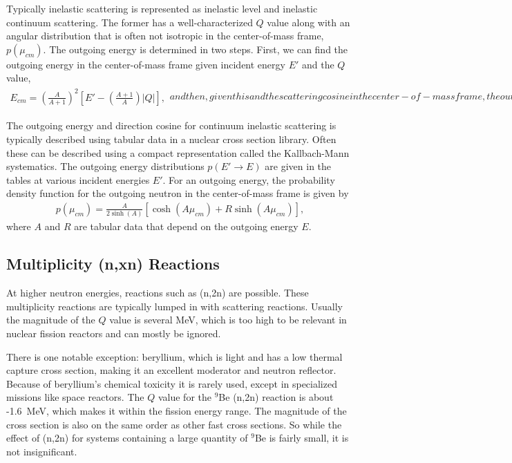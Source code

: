Typically inelastic scattering is represented as inelastic level and inelastic continuum scattering. The former has a well-characterized $Q$ value along with an angular distribution that is often not isotropic in the center-of-mass frame, $p(\mu_{cm})$. The outgoing energy is determined in two steps. First, we can find the outgoing energy in the center-of-mass frame given incident energy $E'$ and the $Q$ value,
\begin{subequations}
\begin{align}
  E_{cm} = \left( \frac{A}{A+1} \right)^2 \left[ E' -  \left( \frac{A+1}{A} \right) |Q| \right] ,
\end{align}
and then, given this and the scattering cosine in the center-of-mass frame, the outgoing energy in the lab frame is
\begin{align}
  E = E_{cm} + \frac{ E' + 2 \mu_{cm} ( A + 1 ) \sqrt{ E' E_{cm} } }{ ( A + 1 )^2 } .
\end{align}
\end{subequations}

The outgoing energy and direction cosine for continuum inelastic scattering is typically described using tabular data in a nuclear cross section library. Often these can be described using a compact representation called the Kallbach-Mann systematics. The outgoing energy distributions $p(E' \rightarrow E)$ are given in the tables at various incident energies $E'$. For an outgoing energy, the probability density function for the outgoing neutron in the center-of-mass frame is given by
\begin{align}
  p(\mu_{cm}) = \frac{A}{2 \sinh(A) } \left[ \cosh(A\mu_{cm}) + R \sinh(A\mu_{cm}) \right],
\end{align}
where $A$ and $R$ are tabular data that depend on the outgoing energy $E$.

\subsection{Multiplicity (n,xn) Reactions}

At higher neutron energies, reactions such as (n,2n) are possible. These multiplicity reactions are typically lumped in with scattering reactions. Usually the magnitude of the $Q$ value is several MeV, which is too high to be relevant in nuclear fission reactors and can mostly be ignored. 

There is one notable exception: beryllium, which is light and has a low thermal capture cross section, making it an excellent moderator and neutron reflector. Because of beryllium's chemical toxicity it is rarely used, except in specialized missions like space reactors. The $Q$ value for the $^9$Be (n,2n) reaction is about -1.6~MeV, which makes it within the fission energy range. The magnitude of the cross section is also on the same order as other fast cross sections. So while the effect of (n,2n) for systems containing a large quantity of $^9$Be is fairly small, it is not insignificant.

